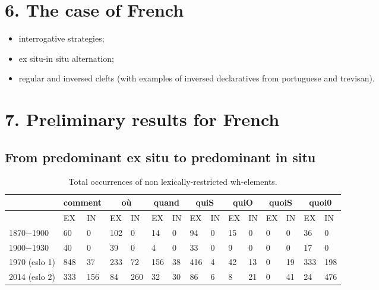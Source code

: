 \documentclass[fleqn,10pt]{wlscirep}
\begin{document}
\section*{6. The case of French}

\begin{itemize}
    \item interrogative strategies;
    \item ex situ-in situ alternation;
    \item regular and inversed clefts (with examples of inversed declaratives from portuguese and trevisan).
    \end{itemize}

\section*{7. Preliminary results for French}

\subsection*{From predominant ex situ to predominant in situ}

\begin{table}[H]
    \centering
    \small
    \begin{adjustbox}{width=\textwidth}
        \begin{tabular}{l|ll|ll|ll|ll|ll|ll|ll}
        {} & \multicolumn{2}{c}{comment}  & \multicolumn{2}{c}{où} & \multicolumn{2}{c}{quand}& \multicolumn{2}{c}{quiS} & \multicolumn{2}{c}{quiO} & \multicolumn{2}{c}{quoiS} & \multicolumn{2}{c}{quoi0}\\
        \hline
        {} & EX & IN & EX & IN & EX & IN & EX & IN & EX & IN & EX & IN & EX & IN\\
        1870$-$1900 & 60 & 0 & 102 & 0 & 14 & 0 & 94 & 0 & 15 & 0 & 0 & 0 & 36 & 0\\
        1900$-$1930 & 40 & 0 & 39 & 0 & 4 & 0 & 33 & 0 & 9 & 0 & 0 & 0 & 17 & 0\\
        1970 (eslo 1) & 848 & 37 & 233 & 72 & 156 & 38 & 416 & 4 & 42 & 13 & 0 & 19 & 333 & 198\\
        2014 (eslo 2) & 333 & 156 & 84 & 260 & 32 & 30 & 86 & 6 & 8 & 21 & 0 & 41 & 24 & 476 \\
        \hline
        \end{tabular}
    \end{adjustbox}
\caption{\label{tab:samp3}Total occurrences of non lexically-restricted wh-elements.}
\end{table}
\end{document}
